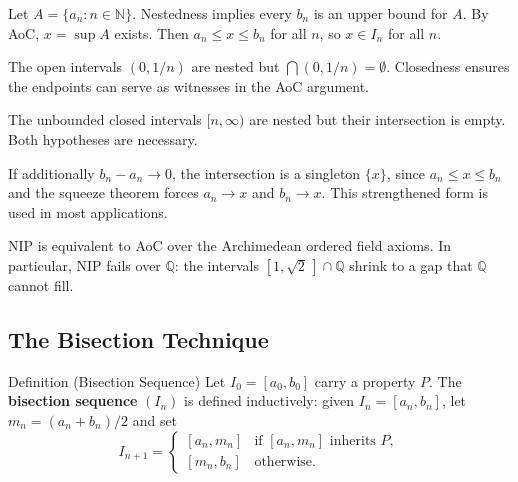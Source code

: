 \begin{remark}
Let $A=\{a_n:n\in\mathbb{N}\}$. Nestedness implies every $b_n$ is an upper
bound for $A$. By AoC, $x=\sup A$ exists. Then $a_n\leq x\leq b_n$ for
all $n$, so $x\in I_n$ for all $n$.
\end{remark}

\begin{remark}
The open intervals $(0,1/n)$ are nested but $\bigcap(0,1/n)=\emptyset$.
Closedness ensures the endpoints can serve as witnesses in the AoC argument.
\end{remark}

\begin{remark}
The unbounded closed intervals $[n,\infty)$ are nested but their intersection
is empty. Both hypotheses are necessary.
\end{remark}

\begin{remark}
If additionally $b_n-a_n\to 0$, the intersection is a singleton $\{x\}$,
since $a_n\leq x\leq b_n$ and the squeeze theorem forces $a_n\to x$ and
$b_n\to x$. This strengthened form is used in most applications.
\end{remark}



\begin{remark}
NIP is equivalent to AoC over the Archimedean ordered field axioms. In
particular, NIP fails over $\mathbb{Q}$: the intervals
$[1,\sqrt{2}\,]\cap\mathbb{Q}$ shrink to a gap that $\mathbb{Q}$ cannot fill.
\end{remark}

\subsection*{The Bisection Technique}
\label{subsec:bisection}

\begin{definitionbox}{Definition (Bisection Sequence)}
\label{def:bisection-sequence}
Let $I_0=[a_0,b_0]$ carry a property $P$. The \textbf{bisection sequence}
$(I_n)$ is defined inductively: given $I_n=[a_n,b_n]$, let
$m_n=(a_n+b_n)/2$ and set
\[
  I_{n+1}=
  \begin{cases}
    [a_n,m_n] & \text{if }[a_n,m_n]\text{ inherits }P,\\
    [m_n,b_n] & \text{otherwise.}
  \end{cases}
\]
\end{definitionbox}

